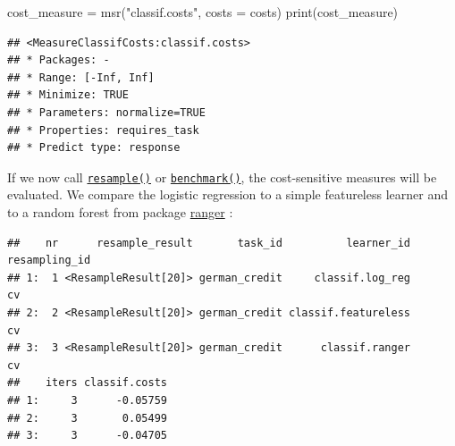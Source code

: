 \documentclass[
]{scrbook}
\newenvironment{Shaded}{\begin{snugshade}}{\end{snugshade}}
\newcommand{\AttributeTok}[1]{\textcolor[rgb]{0.77,0.63,0.00}{#1}}
\newcommand{\DecValTok}[1]{\textcolor[rgb]{0.00,0.00,0.81}{#1}}
\newcommand{\FunctionTok}[1]{\textcolor[rgb]{0.00,0.00,0.00}{#1}}
\newcommand{\NormalTok}[1]{#1}
\newcommand{\OtherTok}[1]{\textcolor[rgb]{0.56,0.35,0.01}{#1}}
\newcommand{\SpecialCharTok}[1]{\textcolor[rgb]{0.00,0.00,0.00}{#1}}
\newcommand{\StringTok}[1]{\textcolor[rgb]{0.31,0.60,0.02}{#1}}
\renewenvironment{Shaded} {\begin{snugshade}\small} {\end{snugshade}}
\begin{document}
\begin{Shaded}
\begin{Highlighting}[]
\NormalTok{cost\_measure }\OtherTok{=} \FunctionTok{msr}\NormalTok{(}\StringTok{"classif.costs"}\NormalTok{, }\AttributeTok{costs =}\NormalTok{ costs)}
\FunctionTok{print}\NormalTok{(cost\_measure)}
\end{Highlighting}
\end{Shaded}

\begin{verbatim}
## <MeasureClassifCosts:classif.costs>
## * Packages: -
## * Range: [-Inf, Inf]
## * Minimize: TRUE
## * Parameters: normalize=TRUE
## * Properties: requires_task
## * Predict type: response
\end{verbatim}

If we now call \href{https://mlr3.mlr-org.com/reference/resample.html}{\texttt{resample()}} or \href{https://mlr3.mlr-org.com/reference/benchmark.html}{\texttt{benchmark()}}, the cost-sensitive measures will be evaluated.
We compare the logistic regression to a simple featureless learner and to a random forest from package \href{https://cran.r-project.org/package=ranger}{ranger} :

\begin{Shaded}
\end{Shaded}

\begin{verbatim}
##    nr      resample_result       task_id          learner_id resampling_id
## 1:  1 <ResampleResult[20]> german_credit     classif.log_reg            cv
## 2:  2 <ResampleResult[20]> german_credit classif.featureless            cv
## 3:  3 <ResampleResult[20]> german_credit      classif.ranger            cv
##    iters classif.costs
## 1:     3      -0.05759
## 2:     3       0.05499
## 3:     3      -0.04705
\end{verbatim}
\end{document}
